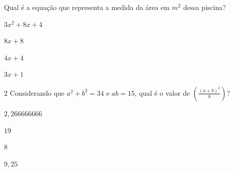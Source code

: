 Qual é a equação que representa a medida da área em $m^2$ dessa piscina?

\begin{escolha}[itemsep=0pt]
\item $3x^2 + 8x + 4$ 
\item $8x + 8$
\item $4x + 4$
\item $3x + 1$
\end{escolha}












\num{2} Considerando que $a^2+ b^2 = 34$ e $ab= 15$, qual é o valor de
$(\frac{(a + b)^2}{8})$?

\begin{escolha}[itemsep=0pt]
\item $2,266666666$
\item $19$
\item  $8$ 
\item $9,25$
\end{escolha}








